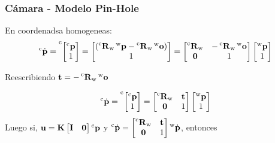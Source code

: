 \begin{frame}
    \frametitle{Cámara - Modelo Pin-Hole}
    
    \footnotesize
    En coordenadsa homogeneas:
    \begin{equation*}
    \homoCameraPoint = 
    \toCoord{\begin{bmatrix}
            \cameraPoint\\
            1
    \end{bmatrix}}{\cameraCoordSystem} =
    \begin{bmatrix}
    \left( \rotationCoord{\cameraCoordSystem}{\worldCoordSystem} \worldPoint -\rotationCoord{\cameraCoordSystem}{\worldCoordSystem} \worldCameraCenter \right)\\
    1
    \end{bmatrix} = 
    \begin{bmatrix}
        \rotationCoord{\cameraCoordSystem}{\worldCoordSystem} & -\rotationCoord{\cameraCoordSystem}{\worldCoordSystem} \worldCameraCenter \\
        \vec{0} & 1
    \end{bmatrix}
    \begin{bmatrix}
     \worldPoint\\
     1
    \end{bmatrix}
    \end{equation*}

    Reescribiendo $\translation = -\rotationCoord{\cameraCoordSystem}{\worldCoordSystem} \worldCameraCenter$
    
    \begin{equation*}
    \homoCameraPoint = 
    \toCoord{\begin{bmatrix}
            \cameraPoint\\
            1
    \end{bmatrix}}{\cameraCoordSystem} = 
    \begin{bmatrix}
        \rotationCoord{\cameraCoordSystem}{\worldCoordSystem} & \translation \\
        \vec{0} & 1
    \end{bmatrix}
    \begin{bmatrix}
        \worldPoint\\
        1
    \end{bmatrix}
    \end{equation*}
    Luego si, $\imagePoint=\intrinsicMatrix\begin{bmatrix} \vec{I} & \vec{0}\end{bmatrix} \cameraPoint$ y $\homoCameraPoint =     \begin{bmatrix}
        \rotationCoord{\cameraCoordSystem}{\worldCoordSystem} & \translation \\
        \vec{0} & 1
    \end{bmatrix}
    \homoWorldPoint$, entonces
    

\end{frame}
